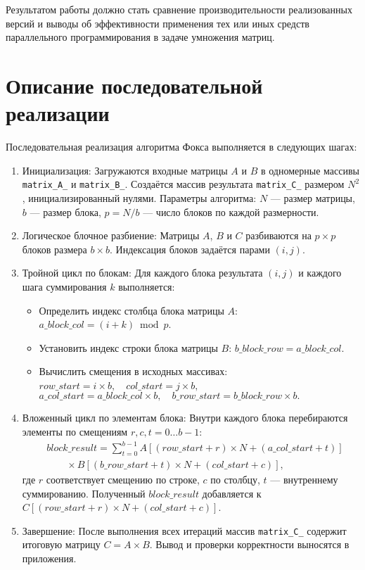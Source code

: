 \documentclass[14pt,a4paper]{extarticle}
\begin{document}
Результатом работы должно стать сравнение производительности реализованных версий и выводы об эффективности применения тех или иных средств параллельного программирования в задаче умножения матриц.
\newpage

\section{Описание последовательной реализации}
Последовательная реализация алгоритма Фокса выполняется в следующих шагах:

\begin{enumerate}
  \item Инициализация: Загружаются входные матрицы $A$ и $B$ в одномерные массивы \texttt{matrix\_A\_} и \texttt{matrix\_B\_}. Создаётся массив результата \texttt{matrix\_C\_} размером $N^2$, инициализированный нулями. Параметры алгоритма: $N$ --- размер матрицы, $b$ --- размер блока, $p = N / b$ --- число блоков по каждой размерности.

  \item Логическое блочное разбиение: Матрицы $A$, $B$ и $C$ разбиваются на $p\times p$ блоков размера $b\times b$. Индексация блоков задаётся парами $(i,j)$.

  \item Тройной цикл по блокам: Для каждого блока результата $(i,j)$ и каждого шага суммирования $k$ выполняется:
  \begin{itemize}
    \item Определить индекс столбца блока матрицы $A$: $a\_block\_col = (i + k) \bmod p$.
    \item Установить индекс строки блока матрицы $B$: $b\_block\_row = a\_block\_col$.
    \item Вычислить смещения в исходных массивах:
    \    \( row\_start = i \times b, \quad col\_start = j \times b, \)
    \    \( a\_col\_start = a\_block\_col \times b, \quad b\_row\_start = b\_block\_row \times b. \)
  \end{itemize}

  \item Вложенный цикл по элементам блока: Внутри каждого блока перебираются элементы по смещениям $r, c, t = 0\ldots b-1$:
  \begin{align*}
    & block\_result = \sum_{t=0}^{b-1} A[(row\_start + r)\times N + (a\_col\_start + t)]\\
    & \quad\quad\times B[(b\_row\_start + t)\times N + (col\_start + c)],
  \end{align*}
  где $r$ соответствует смещению по строке, $c$ по столбцу, $t$ --- внутреннему суммированию.
  Полученный $block\_result$ добавляется к $C[(row\_start + r)\times N + (col\_start + c)]$.

  \item Завершение: После выполнения всех итераций массив \texttt{matrix\_C\_} содержит итоговую матрицу $C = A \times B$. Вывод и проверки корректности выносятся в приложения.
\end{enumerate}
\end{document}
